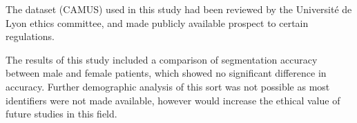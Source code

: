 The dataset (CAMUS) used in this study had been reviewed by the Universit\'e de
Lyon ethics committee, and made publicly available prospect to certain
regulations. \newline

The results of this study included a comparison of segmentation accuracy between
male and female patients, which showed no significant difference in accuracy.
Further demographic analysis of this sort was not possible as most identifiers
were not made available, however would increase the ethical value of future
studies in this field. \newline